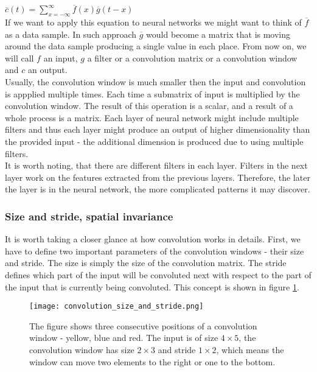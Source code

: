 \documentclass[a4paper,10pt]{report}
\begin{document}
	  $\overline{c}(t) = \sum\limits_{x = -\infty}^\infty \overline{f}(x)\overline{g}(t-x)$ \\%
	  
	  If we want to apply this equation to neural networks we might want to think of $\overline{f}$ as a data sample. In such approach $\overline{g}$ would become a matrix that is moving around the data sample producing a single value in each place. From now on, we will call $f$ an input, $g$ a filter or a convolution matrix or a convolution window and $c$ an output.\\
	  
	  Usually, the convolution window is much smaller then the input and convolution is appplied multiple times. Each time a  submatrix of input is multiplied by the convolution window. The result of this operation is a scalar, and a result of a whole process is a matrix. Each layer of neural network might include multiple filters and thus each layer might produce an output of higher dimensionality than the provided input - the additional dimension is produced due to using multiple filters.\\
	  
	  It is worth noting, that there are different filters in each layer. Filters in the next layer work on the features extracted from the previous layers. Therefore, the later the layer is in the neural network, the more complicated patterns it may discover.\\
	  
	  \subsubsection{Size and stride, spatial invariance}
	  
	  It is worth taking a closer glance at how convolution works in details. First, we have to define two important parameters of the convolution windows - their size and stride. The size is simply the size of the convolution matrix. The stride defines which part of the input will be convoluted next with respect to the part of the input that is currently being convoluted. This concept is shown in figure \ref{fig:convolution_size_and_stride}.\\
	  
	  
	  \begin{figure}[h!]
	    \centering
	    \texttt{[image: convolution\_size\_and\_stride.png]}
	    \caption{The figure shows three consecutive positions of a convolution window - yellow, blue and red. The input is of size $4\times5$, the convolution window has size $2\times3$ and stride $1\times2$, which means the window can move two elements to the right or one to the bottom.}
	    \label{fig:convolution_size_and_stride}
	  \end{figure} 
	  
\end{document}
